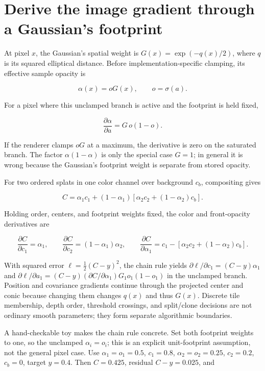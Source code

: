 \section{Derive the image gradient through a Gaussian's footprint}\label{04-visual-computing-ii-ch039-derive-the-image-gradient-through-a-gaussians-footprint}

\hypertarget{04-visual-computing-ii-ch039-derive-the-image-gradient-through-a-gaussians-footprint}{}

At pixel \(x\), the Gaussian's spatial weight is \(G(x)=\exp(-q(x)/2)\), where \(q\) is its squared elliptical distance. Before implementation-specific clamping, its effective sample opacity is

\[
\alpha(x)=oG(x),\qquad o=\sigma(a).
\]

For a pixel where this unclamped branch is active and the footprint is held fixed,

\[
\frac{\partial\alpha}{\partial a}=G\,o(1-o).
\]

If the renderer clamps \(oG\) at a maximum, the derivative is zero on the saturated branch. The factor \(\alpha(1-\alpha)\) is only the special case \(G=1\); in general it is wrong because the Gaussian's footprint weight is separate from stored opacity.

For two ordered splats in one color channel over background \(c_b\), compositing gives

\[
C=\alpha_1c_1+(1-\alpha_1)\left[\alpha_2c_2+(1-\alpha_2)c_b\right].
\]

Holding order, centers, and footprint weights fixed, the color and front-opacity derivatives are

\[
\frac{\partial C}{\partial c_1}=\alpha_1,\qquad
\frac{\partial C}{\partial c_2}=(1-\alpha_1)\alpha_2,
\qquad
\frac{\partial C}{\partial\alpha_1}=c_1-\left[\alpha_2c_2+(1-\alpha_2)c_b\right].
\]

With squared error \(\ell=\tfrac12(C-y)^2\), the chain rule yields \(\partial\ell/\partial c_1=(C-y)\alpha_1\) and \(\partial\ell/\partial a_1=(C-y)(\partial C/\partial\alpha_1)G_1o_1(1-o_1)\) in the unclamped branch. Position and covariance gradients continue through the projected center and conic because changing them changes \(q(x)\) and thus \(G(x)\). Discrete tile membership, depth order, threshold crossings, and split/clone decisions are not ordinary smooth parameters; they form separate algorithmic boundaries.

A hand-checkable toy makes the chain rule concrete. Set both footprint weights to one, so the unclamped \(\alpha_i=o_i\); this is an explicit unit-footprint assumption, not the general pixel case. Use \(\alpha_1=o_1=0.5\), \(c_1=0.8\), \(\alpha_2=o_2=0.25\), \(c_2=0.2\), \(c_b=0\), target \(y=0.4\). Then \(C=0.425\), residual \(C-y=0.025\), and

